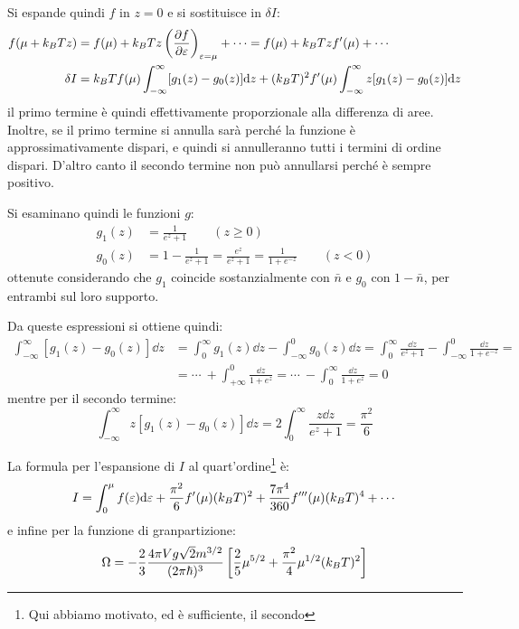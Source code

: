 Si espande quindi $f$ in $z=0$ e si sostituisce in $\delta I$:
\begin{align*}
f(\mu + k_B T z) &= f(\mu) + k_B T z \left(\frac{\partial {f}}{\partial {\varepsilon}}\right)_{\varepsilon = \mu} + \cdots = f(\mu) + k_B T z f'(\mu) + \cdots\\
\delta I &= k_B T f(\mu) \int_{-\infty}^{\infty} [g_1(z) - g_0(z)] \dd z + (k_B T)^2 f'(\mu) \int_{-\infty}^{\infty} z[g_1(z) - g_0(z)] \dd z
\end{align*}
il primo termine è quindi effettivamente proporzionale alla differenza di aree. Inoltre, se il primo termine si annulla sarà perché la funzione è approssimativamente dispari, e quindi si annulleranno tutti i termini di ordine dispari. D'altro canto il secondo termine non può annullarsi perché è sempre positivo.

Si esaminano quindi le funzioni $g$:
\begin{align*}
g_1(z) &= \frac{1}{e^z + 1}	\qquad (z \geq 0)\\
g_0(z) &= 1 - \frac{1}{e^z + 1} = \frac{e^z}{e^z + 1} = \frac{1}{1 + e^{-z}} \qquad (z < 0)
\end{align*}
ottenute considerando che $g_1$ coincide sostanzialmente con $\bar{n}$ e $g_0$ con $1 - \bar{n}$, per entrambi sul loro supporto.

Da queste espressioni si ottiene quindi:
\begin{align*}
	\int_{-\infty}^{\infty} [g_1(z) - g_0(z)] \dd z &= \int_{0}^{\infty} g_1(z) \dd z - \int_{-\infty}^{0} g_0(z) \dd z = \int_{0}^{\infty} \frac{\dd z}{e^z + 1} - \int_{-\infty}^{0} \frac{\dd z}{1 + e^{-z}} =\\
	&= \cdots ~+ \int_{+\infty}^{0} \frac{\dd z}{1 + e^{z}} = \cdots ~- \int_{0}^{\infty} \frac{\dd z}{1 + e^{z}} = 0
\end{align*}
mentre per il secondo termine:
\begin{equation*}
\int_{-\infty}^{\infty} z [g_1(z) - g_0(z)] \dd z = 2 \int_{0}^{\infty} \frac{z\dd z}{e^z + 1} = \frac{\pi^2}{6}
\end{equation*}

La formula per l'espansione di $I$ al quart'ordine\footnote{Qui abbiamo motivato, ed è sufficiente, il secondo} è:
\begin{equation*}
I = \int_{0}^{\mu} f(\varepsilon) \dd \varepsilon +  \frac{\pi^2}{6} f'(\mu) (k_B T)^2 + \frac{7\pi^4}{360} f'''(\mu) (k_B T)^4 + \cdots
\end{equation*}
e infine per la funzione di granpartizione:
\begin{equation*}
\Omega = - \frac{2}{3} \frac{4\pi V g \sqrt{2} m^{3/2}}{(2\pi \hbar)^3}\left[\frac{2}{5}\mu^{5/2} + \frac{\pi^2}{4} \mu^{1/2} (k_B T)^2\right]
\end{equation*}

